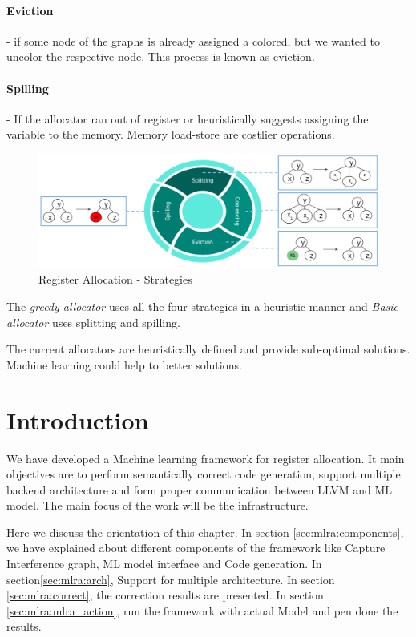 \paragraph{Eviction} - if some node of the graphs is already assigned a colored, but we wanted to uncolor the respective node. This process is known as eviction.
\paragraph{Spilling} - If the allocator ran out of register or heuristically suggests assigning the variable to the memory. Memory load-store are costlier operations.

\begin{figure}[t]
    \centering
    \includegraphics[scale=0.4]{figures/chapter-5/mlra_strategies.png}
    \caption{Register Allocation - Strategies}
     \label{fig:mlra-strat}
\end{figure}

The \textit{greedy allocator} uses all the four strategies in a heuristic manner and \textit{Basic allocator} uses splitting and spilling.

The current allocators are heuristically defined and provide sub-optimal solutions. Machine learning could help to better solutions.

\section{Introduction}\label{sec:mlra:intro}
We have developed a Machine learning framework for register allocation. It main objectives are to perform semantically correct code generation, support multiple backend architecture and form proper communication between LLVM and ML model. The main focus of the work will be the infrastructure.

Here we discuss the orientation of this chapter. In section \ref{sec:mlra:components}, we have explained about different components of the framework like  Capture Interference graph, ML model interface and Code generation. In section\ref{sec:mlra:arch}, Support for multiple architecture. In section \ref{sec:mlra:correct}, the correction results are presented. In section \ref{sec:mlra:mlra_action}, run the framework with actual Model and pen done the results.

